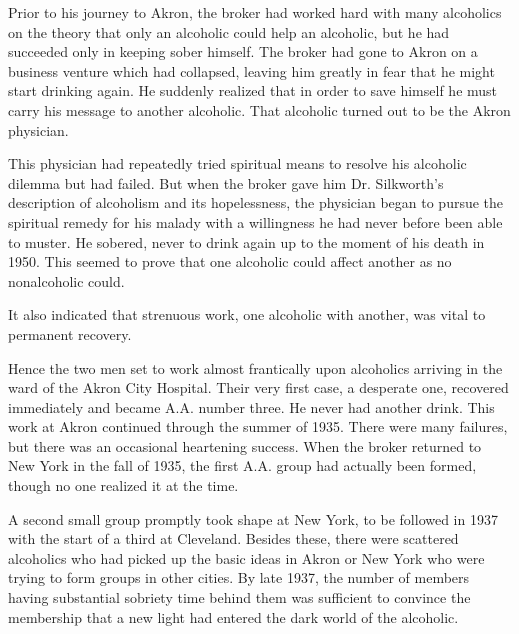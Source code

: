 \begin{biblechapter}
\verse Prior to his journey to Akron, 
    the broker had worked hard with many alcoholics on the theory that only an alcoholic could help an alcoholic, 
    but he had succeeded only in keeping sober himself. 
\verse The broker had gone to Akron on a business venture which had collapsed, 
    leaving him greatly in fear that he might start drinking again. 
\verse He suddenly realized that in order to save himself he must carry his message to another alcoholic. 
\verse That alcoholic turned out to be the Akron physician.

\verse This physician had repeatedly tried spiritual means to resolve his alcoholic dilemma but had failed. 
\verse But when the broker gave him Dr. Silkworth’s description of alcoholism and its hopelessness, 
    the physician began to pursue the spiritual remedy for his malady with a willingness he had never before been able to muster.
\verse He sobered, never to drink again up to the moment of his death in 1950. 
\verse This seemed to prove that one alcoholic could affect another as no nonalcoholic could.

\verse It also indicated that strenuous work, one alcoholic with another, was vital to permanent recovery.

\verse Hence the two men set to work almost frantically upon alcoholics arriving in the ward of the Akron City Hospital. 
\verse Their very first case, a desperate one, recovered immediately and became A.A. number three. 
\verse He never had another drink. 
\verse This work at Akron continued through the summer of 1935. 
\verse There were many failures, but there was an occasional heartening success. 
\verse When the broker returned to New York in the fall of 1935, 
    the first A.A. group had actually been formed, though no one realized it at the time.

\verse A second small group promptly took shape at New York, 
    to be followed in 1937 with the start of a third at Cleveland. 
\verse Besides these, there were scattered alcoholics who had picked up the basic ideas in Akron or New York 
    who were trying to form groups in other cities. 
\verse By late 1937, the number of members having substantial sobriety time behind them 
    was sufficient to convince the membership that a new light had entered the dark world of the alcoholic.


\end{biblechapter}
